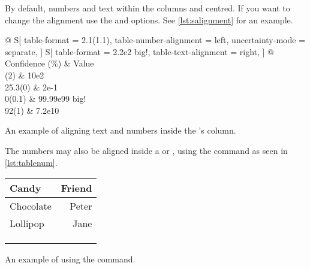 By default, numbers and text within the  columns and centred. If you
want to change the alignment use the  and
 options. See \autoref{lst:salignment} for an
example.
\begin{listing}
  \begin{example}[examplewidth=0.7\linewidth, vertical_mode]
\begin{tabular} {
    @{}
    S[
      table-format = 2.1(1.1),
      table-number-alignment = left,
      uncertainty-mode = separate,
    ]
    S[
      table-format = 2.2e2{ big!},
      table-text-alignment = right,
    ]
    @{}
  }
  \toprule
  {Confidence (\unit{\percent})}
    & {Value} \\
  (2) & 10e2 \\
  25.3(0) & 2e-1 \\
  0(0.1)  & 99.99e99{ big!} \\
  92(1)      & 7.2e10 \\
  \bottomrule
\end{tabular}
\end{example}
  \caption{An example of aligning text and numbers inside the 's
     column.}\label{lst:salignment}
\end{listing}
The numbers may also be aligned inside a  or ,
using the  command as seen in \autoref{lst:tablenum}.
\begin{listing}
  \begin{example}[examplewidth=0.75\linewidth, vertical_mode]
\begin{tabular}{@{}lr@{}}
  \toprule
  Candy     & Friend                         \\
  \midrule
  Chocolate & Peter                          \\
  Lollipop  & Jane                           \\
  \multicolumn{2}{c}{\tablenum{12,34 e0}}    \\
  \multicolumn{2}{c}{\tablenum{333.5567 e1}} \\
  \multicolumn{2}{c}{\tablenum{4563.21 e2}}  \\
  \bottomrule
\end{tabular}
\end{example}
  \caption{An example of using the  command.}\label{lst:tablenum}
\end{listing}

